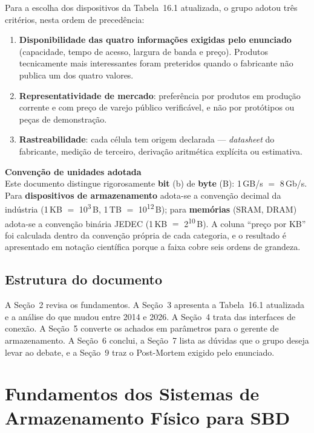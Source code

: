 \documentclass[11pt,a4paper]{article}
\newcommand{\destaque}[2]{%
  \begin{center}\begin{minipage}{0.96\textwidth}
  \colorbox{fundo}{\begin{minipage}{\dimexpr\linewidth-2\fboxsep}
  \vspace{3pt}\textbf{\color{azul}#1}\\[2pt]\small #2\vspace{4pt}
  \end{minipage}}\end{minipage}\end{center}}
\begin{document}
Para a escolha dos dispositivos da Tabela~16.1 atualizada, o grupo adotou três critérios,
nesta ordem de precedência:

\begin{enumerate}[label=\textbf{C\arabic*.}]
\item \textbf{Disponibilidade das quatro informações exigidas pelo enunciado} (capacidade,
      tempo de acesso, largura de banda e preço). Produtos tecnicamente mais interessantes
      foram preteridos quando o fabricante não publica um dos quatro valores.
\item \textbf{Representatividade de mercado}: preferência por produtos em produção corrente
      e com preço de varejo público verificável, e não por protótipos ou peças de
      demonstração.
\item \textbf{Rastreabilidade}: cada célula tem origem declarada --- \emph{datasheet} do
      fabricante, medição de terceiro, derivação aritmética explícita ou estimativa.
\end{enumerate}

\destaque{Convenção de unidades adotada}{%
Este documento distingue rigorosamente \textbf{bit} (b) de \textbf{byte} (B):
1\,GB/s $=$ 8\,Gb/s. Para \textbf{dispositivos de armazenamento} adota-se a convenção
decimal da indústria (1\,KB $=$ 10\textsuperscript{3}\,B, 1\,TB $=$
10\textsuperscript{12}\,B); para \textbf{memórias} (SRAM, DRAM) adota-se a convenção
binária JEDEC (1\,KB $=$ 2\textsuperscript{10}\,B). A coluna ``preço por KB'' foi
calculada dentro da convenção própria de cada categoria, e o resultado é apresentado em
notação científica porque a faixa cobre seis ordens de grandeza.}

\subsection{Estrutura do documento}

A Seção~2 revisa os fundamentos. A Seção~3 apresenta a Tabela~16.1 atualizada e a análise
do que mudou entre 2014 e 2026. A Seção~4 trata das interfaces de conexão. A Seção~5
converte os achados em parâmetros para o gerente de armazenamento. A Seção~6 conclui, a
Seção~7 lista as dúvidas que o grupo deseja levar ao debate, e a Seção~9 traz o
Post-Mortem exigido pelo enunciado.

\section{Fundamentos dos Sistemas de Armazenamento Físico para SBD}
\end{document}
